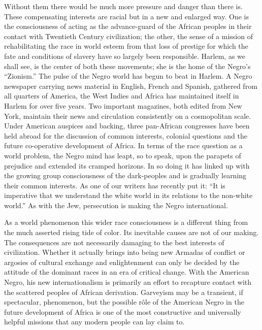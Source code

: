 \documentclass[12pt]{article}
\begin{document}
Without them there would be much more pressure and danger than there is. These compensating interests are racial but in a new and enlarged way. One is the consciousness of acting as the advance-guard of the African peoples in their contact with Twentieth Century civilization; the other, the sense of a mission of rehabilitating the race in world esteem from that loss of prestige for which the fate and conditions of slavery have so largely been responsible. Harlem, as we shall see, is the center of both these movements; she is the home of the Negro's ``Zionism.'' The pulse of the Negro world has begun to beat in Harlem. A Negro newspaper carrying news material in English, French and Spanish, gathered from all quarters of America, the West Indies and Africa has maintained itself in Harlem for over five years. Two important magazines, both edited from New York, maintain their news and circulation consistently on a cosmopolitan scale. Under American auspices and backing, three pan-African congresses have been held abroad for the discussion of common interests, colonial questions and the future co-operative development of Africa. In terms of the race question as a world problem, the Negro mind has leapt, so to speak, upon the parapets of prejudice and extended its cramped horizons. In so doing it has linked up with the growing group consciousness of the dark-peoples and is gradually learning their common interests. As one of our writers has recently put it: ``It is imperative that we understand the white world in its relations to the non-white world.'' As with the Jew, persecution is making the Negro international.

As a world phenomenon this wider race consciousness is a different thing from the much asserted rising tide of color. Its inevitable causes are not of our making. The consequences are not necessarily damaging to the best interests of civilization. Whether it actually brings into being new Armadas of conflict or argosies of cultural exchange and enlightenment can only be decided by the attitude of the dominant races in an era of critical change. With the American Negro, his new internationalism is primarily an effort to recapture contact with the scattered peoples of African derivation. Garveyism may be a transient, if spectacular, phenomenon, but the possible rôle of the American Negro in the future development of Africa is one of the most constructive and universally helpful missions that any modern people can lay claim to.
\end{document}
